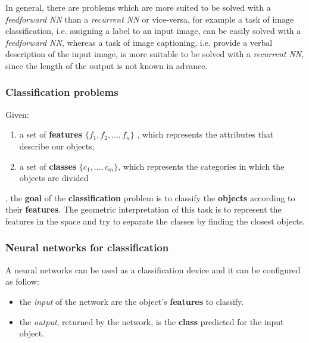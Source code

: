 In general, there are problems which are more suited to be solved with a \textit{feedforward NN} than a \textit{recurrent NN} or vice-versa, for example a task of image classification, i.e. assigning a label to an input image, can be easily solved with a \textit{feedforward NN}, whereas a task of image captioning, i.e. provide a verbal description of the input image, is more suitable to be solved with a \textit{recurrent NN}, since the length of the output is not known in advance. 


\subsubsection{Classification problems}
Given:

\begin{enumerate}

	\item a set of \textbf{features} $\{f_1,f_2,\dots,f_n\}$ , which represents the attributes that describe our objects;
	\item a set of \textbf{classes} $\{c_1,\dots,c_m\}$, which represents the categories in which the objects are divided
 
\end{enumerate}

, the \textbf{goal} of the \textbf{classification} problem is to classify the \textbf{objects} according to their \textbf{features}. The geometric interpretation of this task is to represent the features in the space and try to separate the classes by finding the closest objects.


\subsubsection{Neural networks for classification}

A neural networks can be used as a classification device and it can be configured as follow:

\begin{itemize}

	\item the \textit{input} of the network are the object's \textbf{features} to classify.
 
	\item the \textit{output}, returned by the network, is the \textbf{class} predicted for the input object.
 
\end{itemize}


